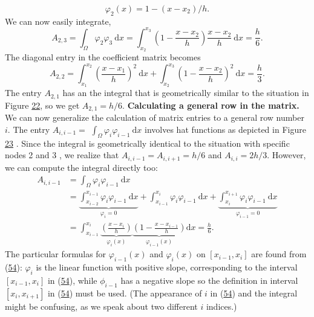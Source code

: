 \documentclass[../main.tex]{subfiles}
\begin{document}
	$$
	\varphi_{2}(x)=1-\left(x-x_{2}\right) / h .
	$$
	We can now easily integrate,
	$$
	A_{2,3}=\int_{\Omega} \varphi_{2} \varphi_{3} \mathrm{~d} x=\int_{x_{2}}^{x_{3}}\left(1-\frac{x-x_{2}}{h}\right) \frac{x-x_{2}}{h} \mathrm{~d} x=\frac{h}{6}.
	$$
	The diagonal entry in the coefficient matrix becomes
	$$
	A_{2,2}=\int_{x_{1}}^{x_{2}}\left(\frac{x-x_{1}}{h}\right)^{2} \mathrm{~d} x+\int_{x_{2}}^{x_{3}}\left(1-\frac{x-x_{2}}{h}\right)^{2} \mathrm{~d} x=\frac{h}{3}.
	$$
	The entry $A_{2,1}$ has an the integral that is geometrically similar to the situation in Figure \hyperref[fig:img_22]{22}, so we get $A_{2,1}=h / 6$.
	\bigbreak
	\noindent \textbf{Calculating a general row in the matrix.} We can now generalize the calculation of matrix entries to a general row number $i$. The entry $A_{i, i-1}=$ $\int_{\Omega} \varphi_{i} \varphi_{i-1} \mathrm{~d} x$ involves hat functions as depicted in Figure \hyperref[fig:img_23]{23} . Since the integral is geometrically identical to the situation with specific nodes 2 and 3 , we realize that $A_{i, i-1}=A_{i, i+1}=h / 6$ and $A_{i, i}=2 h / 3$. However, we can compute the integral directly too:
	$$
	\begin{aligned}
		A_{i, i-1} &=\int_{\Omega} \varphi_{i} \varphi_{i-1} \mathrm{~d} x \\
		&=\underbrace{\int_{x_{i-2}}^{x_{i-1}} \varphi_{i} \varphi_{i-1} \mathrm{~d} x}_{\varphi_{i}=0}+\int_{x_{i-1}}^{x_{i}} \varphi_{i} \varphi_{i-1} \mathrm{~d} x+\underbrace{\int_{x_{i}}^{x_{i+1}} \varphi_{i} \varphi_{i-1} \mathrm{~d} x}_{\varphi_{i-1}=0} \\
		&=\int_{x_{i-1}}^{x_{i}} \underbrace{\left(\frac{x-x_{i}}{h}\right)}_{\varphi_{i}(x)} \underbrace{\left(1-\frac{x-x_{i-1}}{h}\right)}_{\varphi_{i-1}(x)} \mathrm{d} x=\frac{h}{6}.
	\end{aligned}
	$$
	The particular formulas for $\varphi_{i-1}(x)$ and $\varphi_{i}(x)$ on $\left[x_{i-1}, x_{i}\right]$ are found from (\hyperref[eqa54]{54}): $\varphi_{i}$ is the linear function with positive slope, corresponding to the interval $\left[x_{i-1}, x_{i}\right]$ in (\hyperref[eqa54]{54}), while $\phi_{i-1}$ has a negative slope so the definition in interval $\left[x_{i}, x_{i+1}\right]$ in (\hyperref[eqa54]{54}) must be used. (The appearance of $i$ in (\hyperref[eqa54]{54}) and the integral might be confusing, as we speak about two different $i$ indices.)
	
\end{document}
